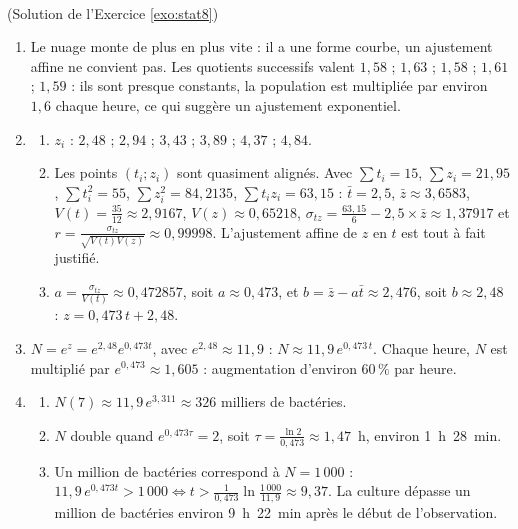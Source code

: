 \begin{corrige}
\begin{sol} ~ \\
(Solution de l'Exercice \ref{exo:stat8})
\begin{enumerate}
\item Le nuage monte de plus en plus vite : il a une forme courbe, un ajustement affine ne convient pas.
      Les quotients successifs valent $1,58$ ; $1,63$ ; $1,58$ ; $1,61$ ; $1,59$ : ils sont presque constants,
      la population est multipli\'ee par environ $1,6$ chaque heure, ce qui sugg\`ere un ajustement exponentiel.
\item \begin{enumerate}
      \item $z_i$ : $2,48$ ; $2,94$ ; $3,43$ ; $3,89$ ; $4,37$ ; $4,84$.
      \item Les points $(t_i ; z_i)$ sont quasiment align\'es. Avec $\sum t_i = 15$, $\sum z_i = 21,95$, 
            $\sum t_i^2 = 55$, $\sum z_i^2 = 84,2135$, $\sum t_i z_i = 63,15$ :
            $\bar{t} = 2,5$, $\bar{z} \approx 3,6583$, $V(t) = \frac{35}{12} \approx 2,9167$, $V(z) \approx 0,65218$,
            $\sigma_{tz} = \frac{63,15}{6} - 2,5 \times \bar{z} \approx 1,37917$ et 
            $r = \frac{\sigma_{tz}}{\sqrt{V(t)V(z)}} \approx 0,99998$. L'ajustement affine de $z$ en $t$ est tout \`a fait justifi\'e.
      \item $a = \frac{\sigma_{tz}}{V(t)} \approx 0,472857$, soit $a \approx 0,473$, et $b = \bar{z} - a\bar{t} \approx 2,476$, 
            soit $b \approx 2,48$ : $\boxed{z = 0,473\,t + 2,48}$.
      \end{enumerate}
\item $N = e^{z} = e^{2,48} e^{0,473 t}$, avec $e^{2,48} \approx 11,9$ : $\boxed{N \approx 11,9\, e^{0,473\,t}}$.
      Chaque heure, $N$ est multipli\'e par $e^{0,473} \approx 1,605$ : augmentation d'environ $60\,\%$ par heure.
\item \begin{enumerate}
      \item $N(7) \approx 11,9\, e^{3,311} \approx 326$ milliers de bact\'eries.
      \item $N$ double quand $e^{0,473 \tau} = 2$, soit $\tau = \frac{\ln 2}{0,473} \approx 1,47$~h, environ 1~h~28~min.
      \item Un million de bact\'eries correspond \`a $N = 1\,000$ : $11,9\, e^{0,473 t} > 1\,000 \iff 
            t > \frac{1}{0,473} \ln\frac{1\,000}{11,9} \approx 9,37$. La culture d\'epasse un million de bact\'eries
            environ 9~h~22~min apr\`es le d\'ebut de l'observation.
      \end{enumerate}
\end{enumerate}
\end{sol}


\end{corrige}
